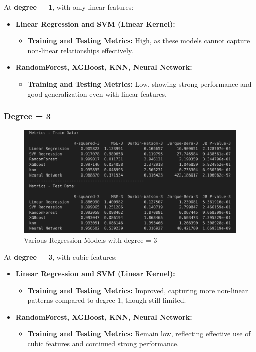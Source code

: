 At \textbf{degree = 1}, with only linear features:

\begin{itemize}
    \item \textbf{Linear Regression and SVM (Linear Kernel):} 
    \begin{itemize}
        \item \textbf{Training and Testing Metrics:} High, as these models cannot capture non-linear relationships effectively.
    \end{itemize}
    
    \item \textbf{RandomForest, XGBoost, KNN, Neural Network:}
    \begin{itemize}
        \item \textbf{Training and Testing Metrics:} Low, showing strong performance and good generalization even with linear features.
    \end{itemize}
\end{itemize}

\subsubsection*{Degree = 3}

\begin{figure}[H]
    \centering
    \includegraphics[width=0.8\linewidth]{./Images/Error-Metrics-Degree-3.png}
    \caption{Various Regression Models with degree = 3}
\end{figure}

At \textbf{degree = 3}, with cubic features:

\begin{itemize}
    \item \textbf{Linear Regression and SVM (Linear Kernel):} 
    \begin{itemize}
        \item \textbf{Training and Testing Metrics:} Improved, capturing more non-linear patterns compared to degree 1, though still limited.
    \end{itemize}
    
    \item \textbf{RandomForest, XGBoost, KNN, Neural Network:}
    \begin{itemize}
        \item \textbf{Training and Testing Metrics:} Remain low, reflecting effective use of cubic features and continued strong performance.
    \end{itemize}
\end{itemize}

